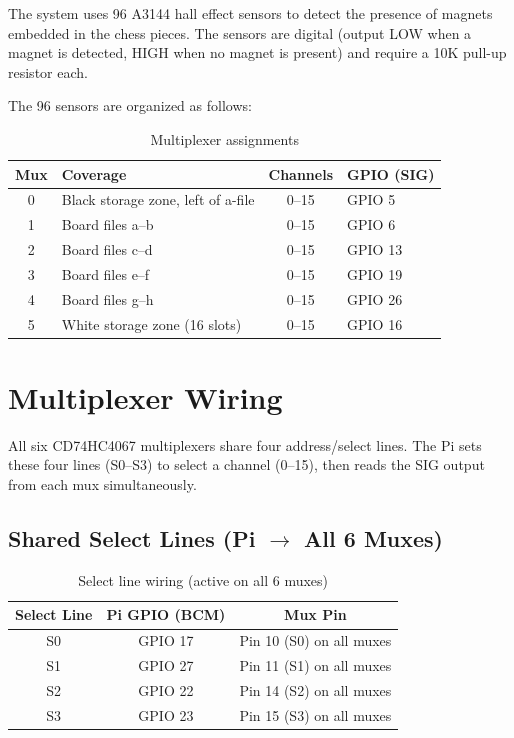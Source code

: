 \documentclass[11pt,a4paper]{report}
\begin{document}
The system uses 96 A3144 hall effect sensors to detect the presence of magnets embedded in the chess pieces. The sensors are digital (output LOW when a magnet is detected, HIGH when no magnet is present) and require a 10K pull-up resistor each.

The 96 sensors are organized as follows:

\begin{table}[H]
\centering
\begin{tabular}{clcl}
\toprule
\textbf{Mux} & \textbf{Coverage} & \textbf{Channels} & \textbf{GPIO (SIG)} \\
\midrule
0 & Black storage zone, left of a-file & 0--15 & GPIO 5 \\
1 & Board files a--b & 0--15 & GPIO 6 \\
2 & Board files c--d & 0--15 & GPIO 13 \\
3 & Board files e--f & 0--15 & GPIO 19 \\
4 & Board files g--h & 0--15 & GPIO 26 \\
5 & White storage zone (16 slots) & 0--15 & GPIO 16 \\
\bottomrule
\end{tabular}
\caption{Multiplexer assignments}
\end{table}

\section{Multiplexer Wiring}

All six CD74HC4067 multiplexers share four address/select lines. The Pi sets these four lines (S0--S3) to select a channel (0--15), then reads the SIG output from each mux simultaneously.

\subsection{Shared Select Lines (Pi $\rightarrow$ All 6 Muxes)}

\begin{table}[H]
\centering
\begin{tabular}{ccc}
\toprule
\textbf{Select Line} & \textbf{Pi GPIO (BCM)} & \textbf{Mux Pin} \\
\midrule
S0 & GPIO 17 & Pin 10 (S0) on all muxes \\
S1 & GPIO 27 & Pin 11 (S1) on all muxes \\
S2 & GPIO 22 & Pin 14 (S2) on all muxes \\
S3 & GPIO 23 & Pin 15 (S3) on all muxes \\
\bottomrule
\end{tabular}
\caption{Select line wiring (active on all 6 muxes)}
\end{table}
\end{document}
